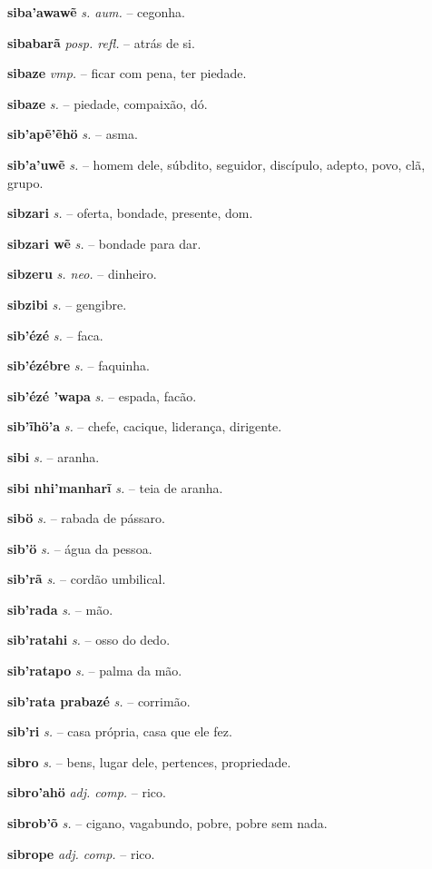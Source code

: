 \textbf{siba'awawẽ} \textit{s. aum.} -- cegonha.

\textbf{sibabarã} \textit{posp. refl.} -- atrás de si.

\textbf{sibaze} \textit{vmp.} -- ficar com pena, ter piedade.

\textbf{sibaze} \textit{s.} -- piedade, compaixão, dó.

\textbf{sib'apẽ'ẽhö} \textit{s.} -- asma.

\textbf{sib'a'uwẽ} \textit{s.} -- homem dele, súbdito, seguidor, discípulo, adepto, povo, clã, grupo.

\textbf{sibzari} \textit{s.} -- oferta, bondade, presente, dom.

\textbf{sibzari wẽ} \textit{s.} -- bondade para dar.

\textbf{sibzeru} \textit{s. neo.} -- dinheiro.

\textbf{sibzibi} \textit{s.} -- gengibre.

\textbf{sib'ézé} \textit{s.} -- faca.

\textbf{sib'ézébre} \textit{s.} -- faquinha.

\textbf{sib'ézé 'wapa} \textit{s.} -- espada, facão.

\textbf{sib'ĩhö'a} \textit{s.} -- chefe, cacique, liderança, dirigente.

\textbf{sibi} \textit{s.} -- aranha.

\textbf{sibi nhi'manharĩ} \textit{s.} -- teia de aranha.

\textbf{sibö} \textit{s.} -- rabada de pássaro.

\textbf{sib'ö} \textit{s.} -- água da pessoa.

\textbf{sib'rã} \textit{s.} -- cordão umbilical.

\textbf{sib'rada} \textit{s.} -- mão.

\textbf{sib'ratahi} \textit{s.} -- osso do dedo.

\textbf{sib'ratapo} \textit{s.} -- palma da mão.

\textbf{sib'rata prabazé} \textit{s.} -- corrimão.

\textbf{sib'ri} \textit{s.} -- casa própria, casa que ele fez.

\textbf{sibro} \textit{s.} -- bens, lugar dele, pertences, propriedade.

\textbf{sibro'ahö} \textit{adj. comp.} -- rico.

\textbf{sibrob'õ} \textit{s.} -- cigano, vagabundo, pobre, pobre sem nada.

\textbf{sibrope} \textit{adj. comp.} -- rico.

